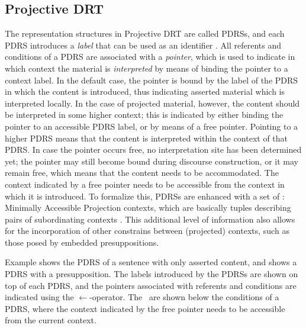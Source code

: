 \subsection{Projective DRT}

The representation structures in Projective DRT are called PDRSs, and each
PDRS introduces a \textit{label} that can be used as an identifier
.  All referents and
conditions of a PDRS are associated with a \textit{pointer}, which is used
to indicate in which context the material is \textit{interpreted} by means
of binding the pointer to a context label.  In the default case, the pointer
is bound by the label of the PDRS in which the content is introduced, thus
indicating asserted material which is interpreted locally. In the case of
projected material, however, the content should be interpreted in some
higher context; this is indicated by either binding the pointer to an
accessible PDRS label, or by means of a free pointer. Pointing to a higher
PDRS means that the content is interpreted within the context of that PDRS.
In case the pointer occurs free, no interpretation site has been determined
yet; the pointer may still become bound during discourse construction, or it
may remain free, which means that the content needs to be accommodated. 
The context indicated by a free pointer needs to be accessible from the
context in which it is introduced.  To formalize this, PDRSs are enhanced
with a set of \MAPs: Minimally Accessible Projection contexts, which are
basically tuples describing pairs of subordinating contexts
. This additional
level of information also allows for the incorporation of other constrains
between (projected) contexts, such as those posed by embedded
presuppositions. 

Example \Next[a] shows the PDRS of a sentence with only asserted content,
and \Next[b] shows a PDRS with a presupposition.  The labels introduced by
the PDRSs are shown on top of each PDRS, and the pointers associated with
referents and conditions are indicated using the $\gets$-operator. The
\MAPs~are shown below the conditions of a PDRS, where the context indicated
by the free pointer needs to be accessible from the current context.

